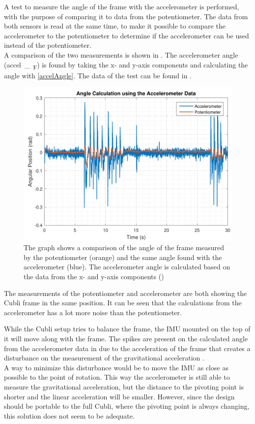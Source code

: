 A test to measure the angle of the frame with the accelerometer is performed, with the purpose of comparing it to data from the potentiometer. The data from both sensors is read at the same time, to make it possible to compare the accelerometer to the potentiometer to determine if the accelerometer can be used instead of the potentiometer.\\
A comparison of the two measurements is shown in . The accelerometer angle (\si{accel\_\theta_{F}}) is found by taking the x- and y-axis components and calculating the angle with \eqref{accelAngle}.
The data of the test can be found in  . 
%
\begin{figure}[H]
	\centering
	\includegraphics[scale=0.65]{figures/angleAcc}
	\caption{The graph shows a comparison of the angle of the frame measured by the potentiometer (orange) and the same angle found with the accelerometer (blue). The accelerometer angle is calculated based on the data from the x- and y-axis components ()}
	\label{angleAcc}
\end{figure}\vspace{-5mm}
%
The measurements of the potentiometer and accelerometer are both showing the Cubli frame in the same position. It can be seen that the calculations from the accelerometer has a lot more noise than the potentiometer.

While the Cubli setup tries to balance the frame, the IMU mounted on the top of it will move along with the frame. The spikes are present on the calculated angle from the accelerometer data in  due to the acceleration of the frame that creates a disturbance on the measurement of the gravitational acceleration \cite{JWarren}.\\
A way to minimize this disturbance would be to move the IMU as close as possible to the point of rotation. This way the accelerometer is still able to measure the gravitational acceleration, but the distance to the pivoting point is  shorter and the linear acceleration will be smaller. However, since the design should be portable to the full Cubli, where the pivoting point is always changing, this solution does not seem to be adequate.

